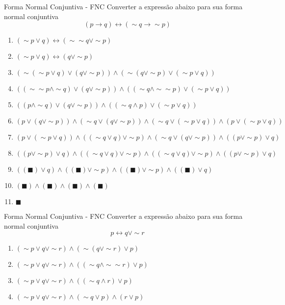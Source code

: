 \begin{frame}[t]{Forma Normal Conjuntiva - FNC}
	Converter a expressão abaixo para sua forma normal conjuntiva $$(p \rightarrow q) \leftrightarrow (\sim q \rightarrow\sim p)$$

	\vskip 0.25cm

	\begin{enumerate}
	\item $(\sim p \vee q) \leftrightarrow (\sim\sim q \vee\sim p)$
	\item $(\sim p \vee q) \leftrightarrow (q \vee\sim p)$
	\item $(\sim(\sim p \vee q) \vee (q \vee\sim p)) \wedge (\sim (q \vee\sim p) \vee (\sim p \vee q))$
	\item $((\sim\sim p \wedge\sim q) \vee (q \vee\sim p)) \wedge ((\sim q \wedge\sim\sim p) \vee (\sim p \vee q))$
	\item $((p \wedge\sim q) \vee (q \vee\sim p)) \wedge ((\sim q \wedge p) \vee (\sim p \vee q))$
	\item $(p\vee (q \vee\sim p)) \wedge (\sim q \vee (q \vee\sim p)) \wedge (\sim q \vee (\sim p \vee q)) \wedge (p \vee (\sim p \vee q))$
	\item $(p\vee (\sim p \vee q)) \wedge ((\sim q \vee q) \vee\sim p) \wedge (\sim q \vee (q \vee \sim p)) \wedge ((p \vee\sim p) \vee q)$
	\item $((p\vee \sim p) \vee q) \wedge ((\sim q \vee q) \vee\sim p) \wedge ((\sim q \vee q) \vee \sim p) \wedge ((p \vee\sim p) \vee q)$
	\item $((\blacksquare) \vee q) \wedge ((\blacksquare) \vee\sim p) \wedge ((\blacksquare) \vee \sim p) \wedge ((\blacksquare) \vee q)$
	\item $(\blacksquare) \wedge (\blacksquare) \wedge (\blacksquare) \wedge (\blacksquare)$
	\item $\blacksquare$
	\end{enumerate}
\end{frame}

\begin{frame}[t]{Forma Normal Conjuntiva - FNC}
	Converter a expressão abaixo para sua forma normal conjuntiva $$p \leftrightarrow q \vee\sim r$$

	\vskip 0.25cm

	\begin{enumerate}
	\item $(\sim p \vee q\vee\sim r) \wedge (\sim(q \vee\sim r) \vee p)$
	\item $(\sim p \vee q\vee\sim r) \wedge ((\sim q \wedge\sim\sim r) \vee p)$
	\item $(\sim p \vee q\vee\sim r) \wedge ((\sim q \wedge r) \vee p)$
	\item $(\sim p \vee q\vee\sim r) \wedge (\sim q \vee p) \wedge (r \vee p)$
	\end{enumerate}
\end{frame}

